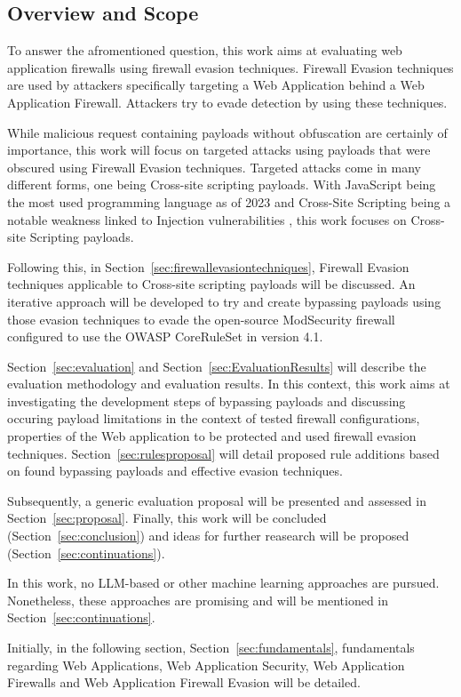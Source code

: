 \subsection{Overview and Scope}
To answer the afromentioned question, this work aims at evaluating web application firewalls using firewall evasion techniques. Firewall Evasion techniques are used by attackers specifically targeting a Web Application behind a Web Application Firewall. Attackers try to evade detection by using these techniques. 

While malicious request containing payloads without obfuscation are certainly of importance, this work will focus on targeted attacks using payloads that were obscured using Firewall Evasion techniques.
Targeted attacks come in many different forms, one being Cross-site scripting payloads.
With JavaScript being the most used programming language as of 2023 \cite{statista/mostusedlang} and Cross-Site Scripting being a notable weakness linked to Injection vulnerabilities \cite{OWASP/Injection21}, this work focuses on Cross-site Scripting payloads.

Following this, in Section~\ref{sec:firewallevasiontechniques}, Firewall Evasion techniques applicable to Cross-site scripting payloads will be discussed. 
An iterative approach will be developed to try and create bypassing payloads using those evasion techniques to evade the open-source ModSecurity firewall configured to use the OWASP CoreRuleSet in version 4.1. 

Section~\ref{sec:evaluation} and Section~\ref{sec:EvaluationResults} will describe the evaluation methodology and evaluation results. In this context, this work aims at investigating the development steps of bypassing payloads and discussing occuring payload limitations in the context of tested firewall configurations, properties of the Web application to be protected and used firewall evasion techniques. Section~\ref{sec:rulesproposal} will detail proposed rule additions based on found bypassing payloads and effective evasion techniques.

Subsequently, a generic evaluation proposal will be presented and assessed in Section~\ref{sec:proposal}. Finally, this work will be concluded (Section~\ref{sec:conclusion}) and ideas for further reasearch will be proposed (Section~\ref{sec:continuations}). 

In this work, no LLM-based or other machine learning approaches are pursued. Nonetheless, these approaches are promising and will be mentioned in Section~\ref{sec:continuations}.

Initially, in the following section, Section~\ref{sec:fundamentals}, fundamentals regarding Web Applications, Web Application Security, Web Application Firewalls and Web Application Firewall Evasion will be detailed.
